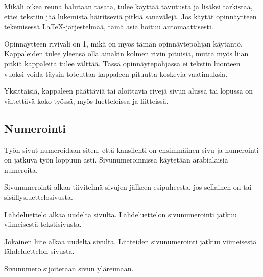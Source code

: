 \documentclass[english, 12pt, a4paper, sci, utf8, a-1b, online]{aaltothesis}
\begin{document}
Mikäli oikea reuna halutaan tasata, tulee käyttää tavutusta ja lisäksi
tarkistaa, ettei tekstiin jää lukemista häiritseviä pitkiä sanavälejä. Jos
käytät opinnäytteen tekemisessä \LaTeX-järjestelmää, 
tämä asia hoituu automaattisesti.

Opinnäytteen riviväli on 1, mikä on myös tämän opinnäytepohjan käytäntö. 
Kappaleiden tulee yleensä olla ainakin kolmen rivin pituisia, mutta
myös liian pitkiä kappaleita tulee välttää.  Tässä opinnäytepohjassa
ei tekstin luonteen vuoksi voida täysin toteuttaa kappaleen pituutta koskevia
vaatimuksia.

Yksittäisiä, kappaleen päättäviä tai aloittavia rivejä sivun alussa
tai lopussa on vältettävä koko työssä, myös luetteloissa ja
liitteissä.

\subsection{Numerointi}

Työn sivut numeroidaan siten, että kansilehti on ensimmäinen sivu ja 
numerointi on jatkuva työn loppuun asti. Sivunumeroinnissa 
käytetään arabialaisia numeroita.

Sivunumerointi alkaa tiivitelmä sivujen jälkeen esipuheesta, jos 
sellainen on tai sisällysluettelosivusta.

Lähdeluettelo alkaa uudelta sivulta. Lähdeluettelon sivunumerointi 
jatkuu viimeisestä tekstisivusta.

Jokainen liite alkaa uudelta sivulta. Liitteiden sivunumerointi
jatkuu viimeisestä lähdeluettelon sivusta.

Sivunumero sijoitetaan sivun yläreunaan.
\end{document}
